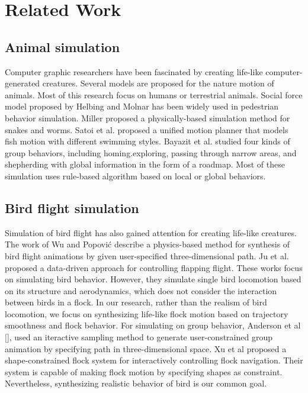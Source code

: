 \chapter{Related Work}

\section{Animal simulation}

Computer graphic researchers have been fascinated by creating life-like computer-generated creatures. Several models are proposed for the nature motion of animals. Most of this research focus on humans or terrestrial animals. Social force model proposed by Helbing and Molnar \cite{Social} has been widely used in pedestrian behavior simulation. Miller \cite{Snake} proposed a physically-based simulation method for snakes and worms. Satoi et al. proposed a unified motion planner \cite{Fish} that models fish motion with different swimming styles. Bayazit et al. \cite{OB1,OB2} studied four kinds of group behaviors, including homing.exploring, passing through narrow areas, and shepherding with global information in the form of a roadmap. Most of these simulation uses rule-based algorithm based on local or global behaviors. 

\section{Bird flight simulation}

Simulation of bird flight has also gained attention for creating life-like creatures. The work of Wu and Popović \cite{Flight} describe a physics-based method for synthesis of bird flight animations by given user-specified three-dimensional path. Ju et al. \cite{Flappy} proposed a data-driven approach for controlling flapping flight. These works focus on simulating bird behavior. However, they simulate single bird locomotion based on its structure and aerodynamics, which does not consider the interaction between birds in a flock. In our research, rather than the realism of bird locomotion, we focus on synthesizing life-like flock motion based on trajectory smoothness and flock behavior. For simulating on group behavior, Anderson et al [], used an iteractive sampling method to generate user-constrained group animation by specifying path in three-dimensional space. Xu et al \cite{Shape} proposed a shape-constrained flock system for interactively controlling flock navigation. Their system is capable of making flock motion by specifying shapes as constraint. Nevertheless, synthesizing realistic behavior of bird is our common goal. 

